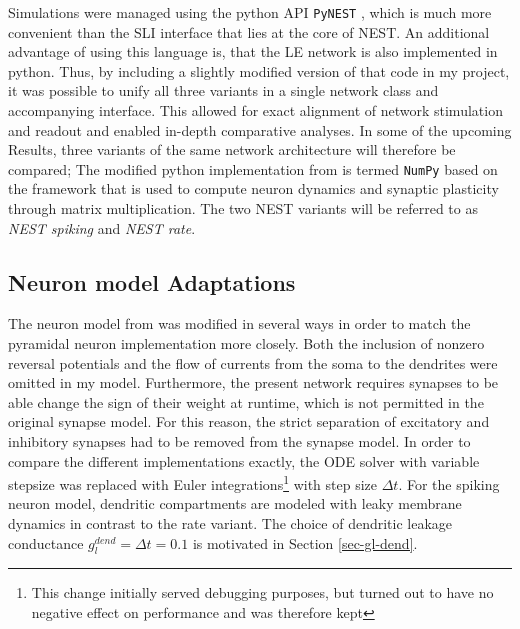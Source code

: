 Simulations were managed using the python API \texttt{PyNEST} \citep{Eppler2009}, which is much more convenient than the
SLI interface that lies at the core of NEST. An additional advantage of using this language is, that the LE network  is
also implemented in python. Thus, by including a slightly modified version of that code in my project, it was possible
to unify all three variants in a single network class and accompanying interface. This allowed for exact alignment of
network stimulation and readout and enabled in-depth comparative analyses. In some of the upcoming Results, three
variants of the same network architecture will therefore be compared; The modified python implementation from
\citep{Haider2021} is termed \texttt{NumPy} based on the framework that is used to compute neuron dynamics and synaptic
plasticity through matrix multiplication. The two NEST variants will be referred to as \textit{NEST spiking} and
\textit{NEST rate}.

\subsection{Neuron model Adaptations}

The neuron model from \citep{Stapmanns2021} was modified in several ways in order to match the pyramidal neuron
implementation more closely. Both the inclusion of nonzero reversal potentials and the flow of currents from the soma to
the dendrites were omitted in my model. Furthermore, the present network requires synapses to be able change the sign of
their weight at runtime, which is not permitted in the original synapse model. For this reason, the strict separation of
excitatory and inhibitory synapses had to be removed from the synapse model. In order to compare the different
implementations exactly, the ODE solver with variable stepsize was replaced with Euler integrations\footnote{This change
  initially served debugging purposes, but turned out to have no negative effect on performance and was therefore kept}
with step size $\Delta t$. For the spiking neuron model, dendritic compartments are modeled with leaky membrane dynamics
in contrast to the rate variant. The choice of dendritic leakage conductance $g_l^{dend}=\Delta t=0.1$ is motivated in
Section \ref{sec-gl-dend}.

